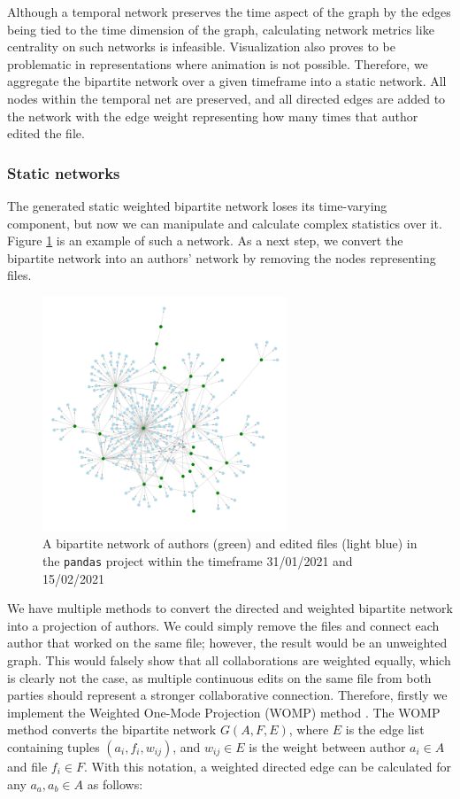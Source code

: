 Although a temporal network preserves the time aspect of the graph by the edges being tied to the time dimension of the graph, calculating network metrics like centrality on such networks is infeasible. Visualization also proves to be problematic in representations where animation is not possible. Therefore, we aggregate the bipartite network over a given timeframe into a static network. All nodes within the temporal net are preserved, and all directed edges are added to the network with the edge weight representing how many times that author edited the file.

\subsubsection{Static networks}
The generated static weighted bipartite network loses its time-varying component, but now we can manipulate and calculate complex statistics over it. Figure \ref{fig:bipartite} is an example of such a network. As a next step, we convert the bipartite network into an authors' network by removing the nodes representing files.

\begin{figure}
    \centering
    \includegraphics[width=0.65\textwidth]{figures/bipartite.png}
    \caption{A bipartite network of authors (green) and edited files (light blue) in the \texttt{pandas} project within the timeframe 31/01/2021 and 15/02/2021}
    \label{fig:bipartite}
\end{figure}

We have multiple methods to convert the directed and weighted bipartite network into a projection of authors. We could simply remove the files and connect each author that worked on the same file; however, the result would be an unweighted graph. This would falsely show that all collaborations are weighted equally, which is clearly not the case, as multiple continuous edits on the same file from both parties should represent a stronger collaborative connection. Therefore, firstly we implement the Weighted One-Mode Projection (WOMP) method \cite{stramWeightedOneMode2017}. The WOMP method converts the bipartite network $G(A,F,E)$, where $E$ is the edge list containing tuples $(a_i,f_i,w_{ij})$, and $w_{ij} \in E$ is the weight between author $a_i \in A$ and file $f_i \in F$. With this notation, a weighted directed edge can be calculated for any $a_a, a_b \in A$ as follows:

